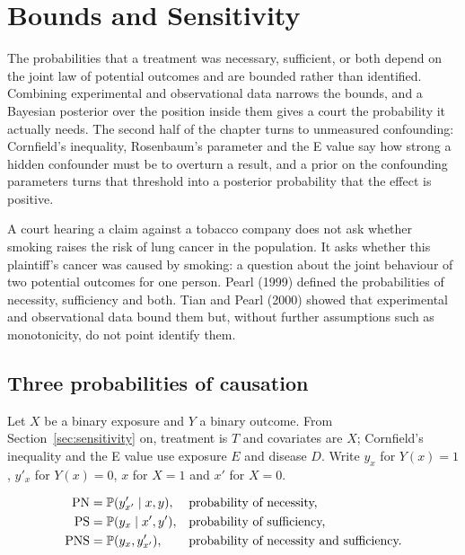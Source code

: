 \chapter{Bounds and Sensitivity}\label{ch:tianpearl}

\begin{tcolorbox}[colback=gray!6,colframe=gray!50,title=In brief,fonttitle=\normalfont\itshape,coltitle=black,colbacktitle=gray!15,boxrule=0.4pt,arc=1pt]
The probabilities that a treatment was necessary, sufficient, or both depend on the joint law of potential outcomes and are bounded rather than identified. Combining experimental and observational data narrows the bounds, and a Bayesian posterior over the position inside them gives a court the probability it actually needs. The second half of the chapter turns to unmeasured confounding: Cornfield's inequality, Rosenbaum's parameter and the E value say how strong a hidden confounder must be to overturn a result, and a prior on the confounding parameters turns that threshold into a posterior probability that the effect is positive.
\end{tcolorbox}

A court hearing a claim against a tobacco company does not ask whether smoking raises the risk of lung cancer in the population. It asks whether this plaintiff's cancer was caused by smoking: a question about the joint behaviour of two potential outcomes for one person. Pearl (1999) defined the probabilities of necessity, sufficiency and both. Tian and Pearl (2000) showed that experimental and observational data bound them but, without further assumptions such as monotonicity, do not point identify them.

\section{Three probabilities of causation}

Let $X$ be a binary exposure and $Y$ a binary outcome. From Section~\ref{sec:sensitivity} on, treatment is $T$ and covariates are $X$; Cornfield's inequality and the E value use exposure $E$ and disease $D$. Write $y_x$ for $Y(x) = 1$, $y'_x$ for $Y(x) = 0$, $x$ for $X = 1$ and $x'$ for $X = 0$.

\begin{definition}
\begin{align*}
\mathrm{PN} &= \mathbb{P}(y'_{x'} \mid x, y), && \text{probability of necessity,}\\
\mathrm{PS} &= \mathbb{P}(y_x \mid x', y'), && \text{probability of sufficiency,}\\
\mathrm{PNS} &= \mathbb{P}(y_x, y'_{x'}), && \text{probability of necessity and sufficiency.}
\end{align*}
\end{definition}

